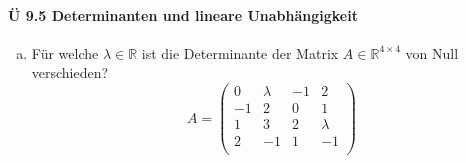\documentclass{scrreprt}
\begin{document}
\paragraph{Ü 9.5 Determinanten und lineare Unabhängigkeit}
\begin{enumerate}[(a)]
\item Für welche $\lambda \in \mathbb{R}$ ist die Determinante der Matrix
  $A \in \mathbb{R}^{4 \times 4}$ von Null verschieden?
  \[
    A = \begin{pmatrix}
      0  & \lambda & -1 & 2       \\
      -1 & 2       & 0  & 1       \\
      1  & 3       & 2  & \lambda \\
      2  & -1      & 1  & -1      \\
    \end{pmatrix}
  \]


\end{enumerate}
\end{document}
